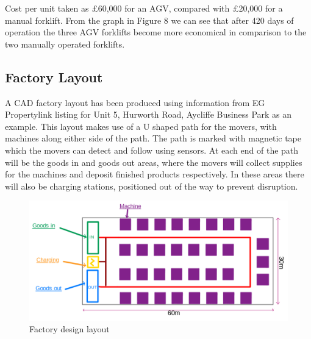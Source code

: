 \documentclass[12pt]{article}
\begin{document}
\FloatBarrier
Cost per unit taken as £60,000 for an AGV, compared with £20,000 for a manual forklift. From the graph in Figure 8 we can see that after 420 days of operation the three AGV forklifts become more economical in comparison to the two manually operated forklifts. 
\FloatBarrier
\subsection{Factory Layout}

 \FloatBarrier
A CAD factory layout has been produced using information from EG Propertylink listing for Unit 5, Hurworth Road, Aycliffe Business Park \cite{mileway_hurworth_2024} as an example. This layout makes use of a U shaped path for the movers, with  machines along either side of the path. The path is marked with magnetic tape which the movers can detect and follow using sensors. At each end  of the path will be the goods in and goods out areas, where the movers will collect supplies for the machines and deposit finished products respectively. In these areas there will also be charging stations, positioned out of the way to prevent disruption.
\begin{figure}[ht]


        \centering
        \includegraphics[width=0.9\linewidth]{Factory Layout Louis Big Text.png}
        \caption{Factory design layout}
        \label{fig:factory_layout}

\end{figure}
\FloatBarrier
 
\end{document}
